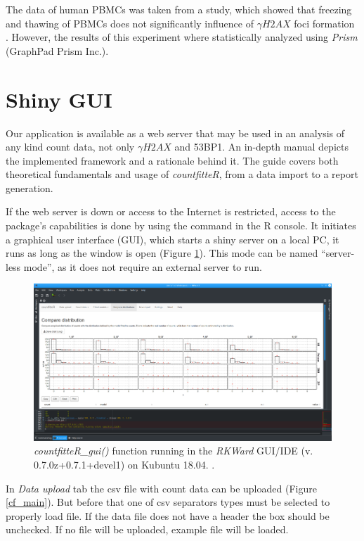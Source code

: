 The data of human PBMCs was taken from a study, which showed that freezing and thawing of PBMCs does not significantly influence of $\gamma H2AX$ foci formation \citep{ruhe_effect_2018}. However, the results of this experiment where statistically analyzed using \emph{Prism} (GraphPad Prism Inc.).

\section{Shiny GUI} %

Our application is available as a web server that may be used in an analysis of any kind count data, not only $\gamma H2AX$ and 53BP1. An in-depth manual depicts the implemented framework and a rationale behind it. The guide covers both theoretical fundamentals and usage of \emph{countfitteR}, from a data import to a report generation.

If the web server is down or access to the Internet is restricted, access to the package’s capabilities is done by using the command in the R console. It initiates a graphical user interface (GUI), which starts a shiny server on a local PC, it runs as long as the window is open (Figure \ref{fig_gui}). This mode can be named “server-less mode”, as it does not require an external server to run.

\begin{figure}[htbp]
  \centering
  \includegraphics[width=0.99\columnwidth]{fig_gui}
  \caption{\emph{countfitteR\_gui()} function running in the \emph{RKWard} GUI/IDE (v. 0.7.0z+0.7.1+devel1) on Kubuntu 18.04. \citep{rodiger_rkward:_2012}.}
  \label{fig_gui}
\end{figure}
In \textit{Data upload} tab the csv file with count data can be uploaded (Figure \ref{cf_main}). But before that one of csv separators types must be selected to properly load file. If the data file does not have a header the box should be unchecked. If no file will be uploaded, example file will be loaded.

